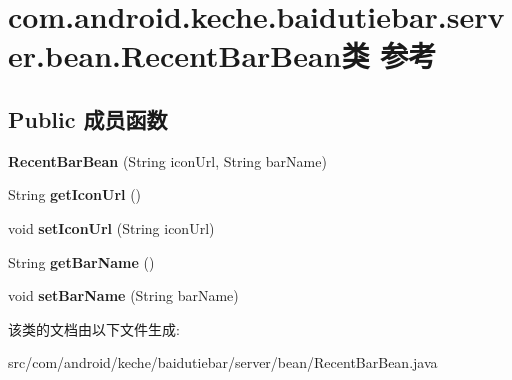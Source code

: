 \hypertarget{classcom_1_1android_1_1keche_1_1baidutiebar_1_1server_1_1bean_1_1_recent_bar_bean}{}\section{com.\+android.\+keche.\+baidutiebar.\+server.\+bean.\+Recent\+Bar\+Bean类 参考}
\label{classcom_1_1android_1_1keche_1_1baidutiebar_1_1server_1_1bean_1_1_recent_bar_bean}
\subsection*{Public 成员函数}
\begin{DoxyCompactItemize}
\item 
\mbox{\label{classcom_1_1android_1_1keche_1_1baidutiebar_1_1server_1_1bean_1_1_recent_bar_bean_ae0efebecabee093be66c3ce942abf602}} 
{\bfseries Recent\+Bar\+Bean} (String icon\+Url, String bar\+Name)
\item 
\mbox{\label{classcom_1_1android_1_1keche_1_1baidutiebar_1_1server_1_1bean_1_1_recent_bar_bean_aab1e8c2a881e2955ed4b1b025160f745}} 
String {\bfseries get\+Icon\+Url} ()
\item 
\mbox{\label{classcom_1_1android_1_1keche_1_1baidutiebar_1_1server_1_1bean_1_1_recent_bar_bean_a2dca383872951db0b97d4a1add177baf}} 
void {\bfseries set\+Icon\+Url} (String icon\+Url)
\item 
\mbox{\label{classcom_1_1android_1_1keche_1_1baidutiebar_1_1server_1_1bean_1_1_recent_bar_bean_a6a57d3c5c92ff51af25d3bbfb47214b4}} 
String {\bfseries get\+Bar\+Name} ()
\item 
\mbox{\label{classcom_1_1android_1_1keche_1_1baidutiebar_1_1server_1_1bean_1_1_recent_bar_bean_a233636a1ab32f8762b15cf9b72eb1c03}} 
void {\bfseries set\+Bar\+Name} (String bar\+Name)
\end{DoxyCompactItemize}


该类的文档由以下文件生成\+:\begin{DoxyCompactItemize}
\item 
src/com/android/keche/baidutiebar/server/bean/Recent\+Bar\+Bean.\+java\end{DoxyCompactItemize}

